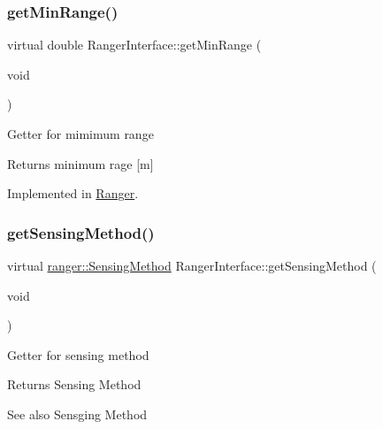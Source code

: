 \mbox{\label{classRangerInterface_ae6d501ddeeaad4a7b44d7d51ce64cb88}} 
\subsubsection{\texorpdfstring{get\+Min\+Range()}{getMinRange()}}
{\footnotesize\ttfamily virtual double Ranger\+Interface\+::get\+Min\+Range (\begin{DoxyParamCaption}\item[{void}]{ }\end{DoxyParamCaption})\hspace{0.3cm}{\ttfamily [pure virtual]}}

Getter for mimimum range \begin{DoxyReturn}{Returns}
minimum rage \mbox{[}m\mbox{]} 
\end{DoxyReturn}


Implemented in \hyperlink{classRanger_a646a06d3916179b9ebc4502bad169eec}{Ranger}.

\mbox{\label{classRangerInterface_aeb06b9835f2b162b81917bd27797549b}} 
\subsubsection{\texorpdfstring{get\+Sensing\+Method()}{getSensingMethod()}}
{\footnotesize\ttfamily virtual \hyperlink{namespaceranger_ab04465c229cc50595ffe40a891a3b135}{ranger\+::\+Sensing\+Method} Ranger\+Interface\+::get\+Sensing\+Method (\begin{DoxyParamCaption}\item[{void}]{ }\end{DoxyParamCaption})\hspace{0.3cm}{\ttfamily [pure virtual]}}

Getter for sensing method \begin{DoxyReturn}{Returns}
Sensing Method 
\end{DoxyReturn}
\begin{DoxySeeAlso}{See also}
Sensging Method 
\end{DoxySeeAlso}


